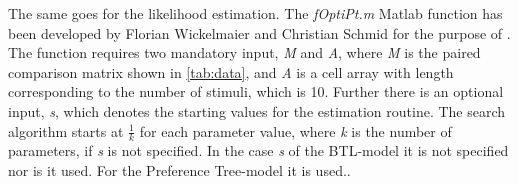 The same goes for the likelihood estimation. The \textit{fOptiPt.m} Matlab function has been developed by Florian Wickelmaier and Christian Schmid for the purpose of  \parencite{Wickelmaier2004}. The function requires two mandatory input, \textit{M} and \textit{A}, where \textit{M} is the paired comparison matrix shown in \autoref{tab:data}, and \textit{A} is a cell array with length corresponding to the number of stimuli, which is 10. Further there is an optional input, \textit{s}, which denotes the starting values for the estimation routine. The search algorithm starts at $\frac{1}{k}$ for each parameter value, where \textit{k} is the number of parameters, if \textit{s} is not specified. In the case \textit{s} of the BTL-model it is not specified nor is it used. For the Preference Tree-model it is used.. \fxnote{}
\vfill